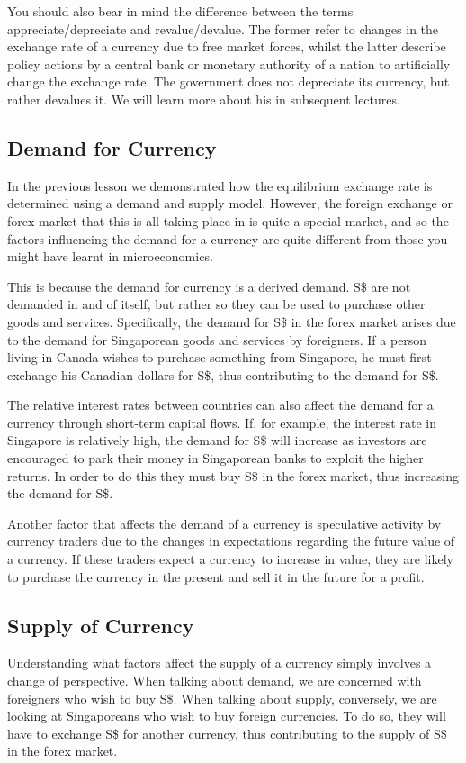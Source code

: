 You should also bear in mind the difference between the terms appreciate/depreciate and revalue/devalue. The former refer to changes in the exchange rate of a currency due to free market forces, whilst the latter describe policy actions by a central bank or monetary authority of a nation to artificially change the exchange rate. The government does not depreciate its currency, but rather devalues it. We will learn more about his in subsequent lectures.
\subsection{Demand for Currency}
In the previous lesson we demonstrated how the equilibrium exchange rate is determined using a demand and supply model. However, the foreign exchange or forex market that this is all taking place in is quite a special market, and so the factors influencing the demand for a currency are quite different from those you might have learnt in microeconomics.

This is because the demand for currency is a derived demand. S\$ are not demanded in and of itself, but rather so they can be used to purchase other goods and services. Specifically, the demand for S\$ in the forex market arises due to the demand for Singaporean goods and services by foreigners. If a person living in Canada wishes to purchase something from Singapore, he must first exchange his Canadian dollars for S\$, thus contributing to the demand for S\$.

The relative interest rates between countries can also affect the demand for a currency through short-term capital flows. If, for example, the interest rate in Singapore is relatively high, the demand for S\$ will increase as investors are encouraged to park their money in Singaporean banks to exploit the higher returns. In order to do this they must buy S\$ in the forex market, thus increasing the demand for S\$.

Another factor that affects the demand of a currency is speculative activity by currency traders due to the changes in expectations regarding the future value of a currency. If these traders expect a currency to increase in value, they are likely to purchase the currency in the present and sell it in the future for a profit.
\subsection{Supply of Currency}
Understanding what factors affect the supply of a currency simply involves a change of perspective. When talking about demand, we are concerned with foreigners who wish to buy S\$. When talking about supply, conversely, we are looking at Singaporeans who wish to buy foreign currencies. To do so, they will have to exchange S\$ for another currency, thus contributing to the supply of S\$ in the forex market.

